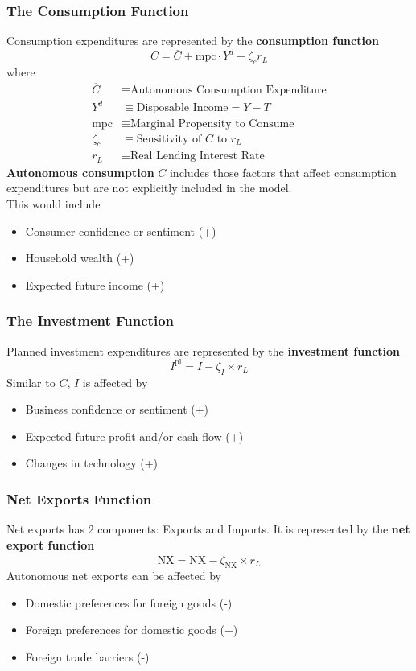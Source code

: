 \documentclass[a4paper]{article}
\begin{document}
\subsubsection*{The Consumption Function}
Consumption expenditures are represented by the \textbf{consumption function}
\[ C = \overline{C} + \text{mpc} \cdot Y^d - \zeta_c  r_L \]
where
\begin{align*}
    \overline{C} &\equiv \text{Autonomous Consumption Expenditure} \\
    Y^d &\equiv \text{Disposable Income} = Y - T \\
    \text{mpc} &\equiv \text{Marginal Propensity to Consume} \\
    \zeta_c &\equiv \text{Sensitivity of $C$ to $r_L$} \\
    r_L &\equiv \text{Real Lending Interest Rate}
\end{align*}
\textbf{Autonomous consumption } $\overline{C}$ includes those factors that
affect consumption expenditures but are not explicitly included in the model.
\smallskip \\
This would include \begin{itemize}
    \item Consumer confidence or sentiment (+)
    \item Household wealth (+)
    \item Expected future income (+)
\end{itemize}

\subsubsection*{The Investment Function}
Planned investment expenditures are represented by the 
\textbf{investment function}
\[ I^{\text{pl}} = \overline{I} - \zeta_I \times r_L \]
Similar to $\overline{C}$, $\overline{I}$ is affected by \begin{itemize}
    \item Business confidence or sentiment (+)
    \item Expected future profit and/or cash flow (+)
    \item Changes in technology (+)
\end{itemize}

\subsubsection*{Net Exports Function}
Net exports has 2 components: Exports and Imports. It is represented by the
\textbf{net export function}
\[ \text{NX} = \overline{\text{NX}} - \zeta_{\text{NX}} \times r_L \]
Autonomous net exports can be affected by \begin{itemize}
    \item Domestic preferences for foreign goods (-)
    \item Foreign preferences for domestic goods (+)
    \item Foreign trade barriers (-)
\end{itemize}
\end{document}
